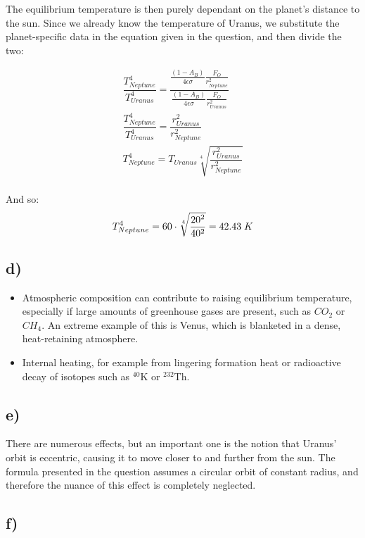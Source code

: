 The equilibrium temperature is then purely dependant on the planet's distance to the sun. Since we already know the temperature of Uranus, we substitute the planet-specific data in the equation given in the question, and then divide the two:

\begin{equation}
    \begin{split}
        \dfrac{T_{Neptune}^4}{T_{Uranus}^4} = \dfrac{\frac{(1-A_B)}{4\epsilon \sigma} \frac{F_O}{r_{Neptune}^2}} {\frac{(1-A_B)}{4\epsilon \sigma} \frac{F_O}{r_{Uranus}^2}} \\
        \dfrac{T_{Neptune}^4}{T_{Uranus}^4} = \dfrac{r_{Uranus}^2}{r_{Neptune}^2}\\
        T_{Neptune}^4 = T_{Uranus} \sqrt[4]{\dfrac{r_{Uranus}^2}{r_{Neptune}^2}}\\
    \end{split}
\end{equation}

And so: 
\begin{equation}
    T_{Neptune}^4 = 60 \cdot \sqrt[4]{\dfrac{20^2}{40^2}} = 42.43 \; K\\
\end{equation}


\subsection*{d)}
\begin{itemize}
    \item Atmospheric composition can contribute to raising equilibrium temperature, especially if large amounts of greenhouse gases are present, such as $CO_2$ or $CH_4$. An extreme example of this is Venus, which is blanketed in a dense, heat-retaining atmosphere. 
    \item Internal heating, for example from lingering formation heat or radioactive decay of isotopes such as $^{40}$K or $^{232}$Th.
\end{itemize}

\subsection*{e)}
There are numerous effects, but an important one is the notion that Uranus' orbit is eccentric, causing it to move closer to and further from the sun. The formula presented in the question assumes a circular orbit of constant radius, and therefore the nuance of this effect is completely neglected.

\subsection*{f)}
